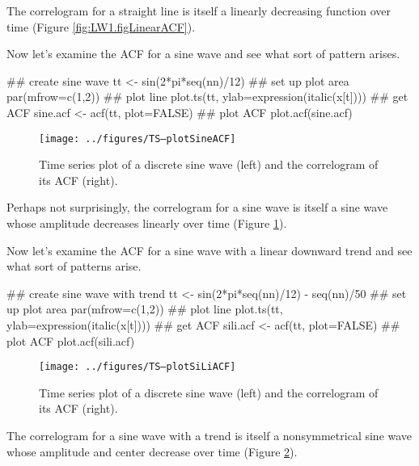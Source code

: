 \noindent The correlogram for a straight line is itself a linearly decreasing function over time (Figure \ref{fig:LW1.figLinearACF}).

Now let's examine the ACF for a sine wave and see what sort of pattern arises.

\begin{Schunk}
\begin{Sinput}
 ## create sine wave
 tt <- sin(2*pi*seq(nn)/12)
 ## set up plot area
 par(mfrow=c(1,2))
 ## plot line
 plot.ts(tt, ylab=expression(italic(x[t])))
 ## get ACF
 sine.acf <- acf(tt, plot=FALSE)
 ## plot ACF
 plot.acf(sine.acf)
\end{Sinput}
\end{Schunk}

  
\begin{figure}[htp]
\begin{center}
\texttt{[image: ../figures/TS--plotSineACF]}
\end{center}
\caption{Time series plot of a discrete sine wave (left) and the correlogram of its ACF (right).}
\label{fig:LW1.figSineACF}
\end{figure}

\noindent Perhaps not surprisingly, the correlogram for a sine wave is itself a sine wave whose amplitude decreases linearly over time (Figure \ref{fig:LW1.figSineACF}).

Now let's examine the ACF for a sine wave with a linear downward trend and see what sort of patterns arise.

\begin{Schunk}
\begin{Sinput}
 ## create sine wave with trend
 tt <- sin(2*pi*seq(nn)/12) - seq(nn)/50
 ## set up plot area
 par(mfrow=c(1,2))
 ## plot line
 plot.ts(tt, ylab=expression(italic(x[t])))
 ## get ACF
 sili.acf <- acf(tt, plot=FALSE)
 ## plot ACF
 plot.acf(sili.acf)
\end{Sinput}
\end{Schunk}

  
\begin{figure}[htp]
\begin{center}
\texttt{[image: ../figures/TS--plotSiLiACF]}
\end{center}
\caption{Time series plot of a discrete sine wave (left) and the correlogram of its ACF (right).}
\label{fig:LW1.figSiLiACF}
\end{figure}

\noindent The correlogram for a sine wave with a trend is itself a nonsymmetrical sine wave whose amplitude and center decrease over time (Figure \ref{fig:LW1.figSiLiACF}).

